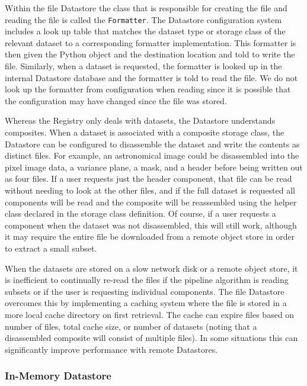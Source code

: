 \documentclass[]{spie}
\begin{document}
Within the file Datastore the class that is responsible for creating the file and reading the file is called the \texttt{Formatter}.
The Datastore configuration system includes a look up table that matches the dataset type or storage class of the relevant dataset to a corresponding formatter implementation.
This formatter is then given the Python object and the destination location and told to write the file.
Similarly, when a dataset is requested, the formatter is looked up in the internal Datastore database and the formatter is told to read the file.
We do not look up the formatter from configuration when reading since it is possible that the configuration may have changed since the file was stored.

Whereas the Registry only deals with datasets, the Datastore understands composites.
When a dataset is associated with a composite storage class, the Datastore can be configured to disassemble the dataset and write the contents as distinct files.
For example, an astronomical image could be disassembled into the pixel image data, a variance plane, a mask, and a header before being written out as four files.
If a user requests just the header component, that file can be read without needing to look at the other files, and if the full dataset is requested all components will be read and the composite will be reassembled using the helper class declared in the storage class definition.
Of course, if a user requests a component when the dataset was not disassembled, this will still work, although it may require the entire file be downloaded from a remote object store in order to extract a small subset.

When the datasets are stored on a slow network disk or a remote object store, it is inefficient to continually re-read the files if the pipeline algorithm is reading subsets or if the user is requesting individual components.
The file Datastore overcomes this by implementing a caching system where the file is stored in a more local cache directory on first retrieval.
The cache can expire files based on number of files, total cache size, or number of datasets (noting that a disassembled composite will consist of multiple files).
In some situations this can significantly improve performance with remote Datastores.

\subsubsection{In-Memory Datastore}
\end{document}
